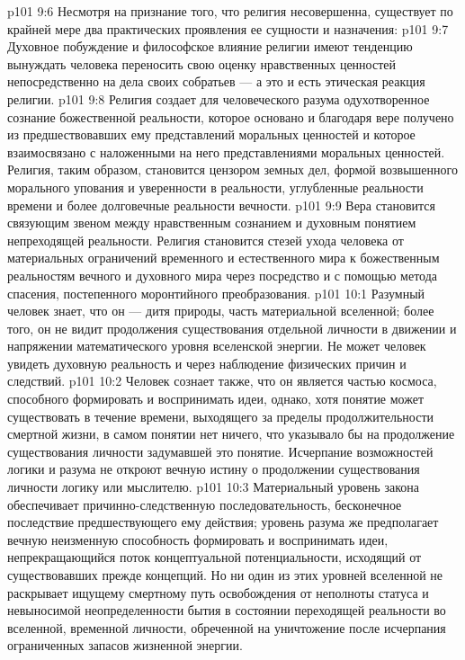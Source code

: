 \vs p101 9:6 \pc Несмотря на признание того, что религия несовершенна, существует по крайней мере два практических проявления ее сущности и назначения:
\vs p101 9:7 \bibnobreakspace Духовное побуждение и философское влияние религии имеют тенденцию вынуждать человека переносить свою оценку нравственных ценностей непосредственно на дела своих собратьев --- а это и есть этическая реакция религии.
\vs p101 9:8 \bibnobreakspace Религия создает для человеческого разума одухотворенное сознание божественной реальности, которое основано и благодаря вере получено из предшествовавших ему представлений моральных ценностей и которое взаимосвязано с наложенными на него представлениями моральных ценностей. Религия, таким образом, становится цензором земных дел, формой возвышенного морального упования и уверенности в реальности, углубленные реальности времени и более долговечные реальности вечности.
\vs p101 9:9 \pc Вера становится связующим звеном между нравственным сознанием и духовным понятием непреходящей реальности. Религия становится стезей ухода человека от материальных ограничений временного и естественного мира к божественным реальностям вечного и духовного мира через посредство и с помощью метода спасения, постепенного моронтийного преобразования.
\vs p101 10:1 Разумный человек знает, что он --- дитя природы, часть материальной вселенной; более того, он не видит продолжения существования отдельной личности в движении и напряжении математического уровня вселенской энергии. Не может человек увидеть духовную реальность и через наблюдение физических причин и следствий.
\vs p101 10:2 Человек сознает также, что он является частью космоса, способного формировать и воспринимать идеи, однако, хотя понятие может существовать в течение времени, выходящего за пределы продолжительности смертной жизни, в самом понятии нет ничего, что указывало бы на продолжение существования личности задумавшей это понятие. Исчерпание возможностей логики и разума не откроют вечную истину о продолжении существования личности логику или мыслителю.
\vs p101 10:3 Материальный уровень закона обеспечивает причинно\hyp{}следственную последовательность, бесконечное последствие предшествующего ему действия; уровень разума же предполагает вечную неизменную способность формировать и воспринимать идеи, непрекращающийся поток концептуальной потенциальности, исходящий от существовавших прежде концепций. Но ни один из этих уровней вселенной не раскрывает ищущему смертному путь освобождения от неполноты статуса и невыносимой неопределенности бытия в состоянии переходящей реальности во вселенной, временной личности, обреченной на уничтожение после исчерпания ограниченных запасов жизненной энергии.

